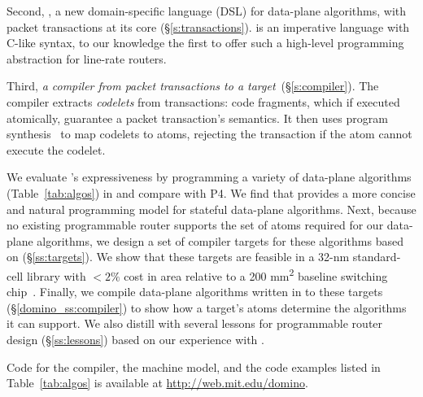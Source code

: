Second, {\em \pktlanguage{}}, a new domain-specific language (DSL) for
data-plane algorithms, with packet transactions at its core
(\S\ref{s:transactions}).  \pktlanguage is an imperative language with C-like
syntax, to our knowledge the first to offer such a high-level programming
abstraction for line-rate routers.

Third, {\em a compiler from \pktlanguage packet transactions to a \absmachine
target}~(\S\ref{s:compiler}). The \pktlanguage compiler extracts {\em codelets}
from  transactions: code fragments, which if executed atomically, guarantee a
packet transaction's semantics. It then uses program
synthesis~\cite{sketch_asplos} to map codelets to atoms, rejecting the
transaction if the atom cannot execute the codelet.

We evaluate \pktlanguage's expressiveness by programming a variety of
data-plane algorithms (Table~\ref{tab:algos}) in \pktlanguage and compare with
P4. We find that \pktlanguage provides a more concise and natural programming
model for stateful data-plane algorithms.  Next, because no existing
programmable router supports the set of atoms required for our data-plane
algorithms, we design a set of compiler targets for these algorithms based on
\absmachine (\S\ref{ss:targets}).  We show that these targets are feasible in a
32-nm standard-cell library with $< 2\%$ cost in area relative to a 200
\si{\milli\metre\squared} baseline switching chip~\cite{gibb_parsing}.
Finally, we compile data-plane algorithms written in \pktlanguage to these
targets (\S\ref{domino_ss:compiler}) to show how a target's atoms determine the
algorithms it can support. We also distill with several lessons for
programmable router design (\S\ref{ss:lessons}) based on our experience with
\pktlanguage.

Code for the \pktlanguage compiler, the \absmachine machine model, and the code
examples listed in Table~\ref{tab:algos} is available at
\url{http://web.mit.edu/domino}.
